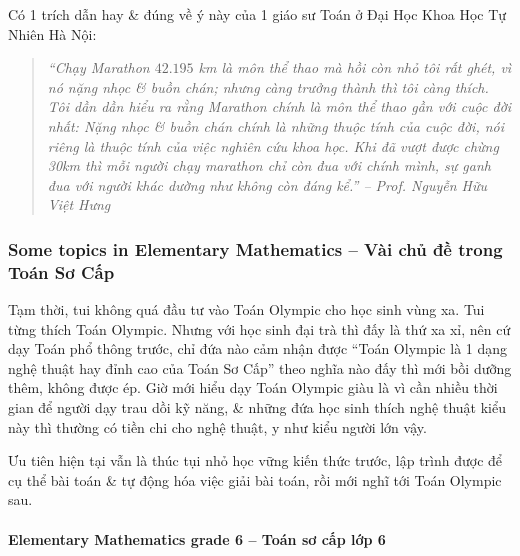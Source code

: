 \documentclass[12pt]{article}
\begin{document}
Có 1 trích dẫn hay \& đúng về ý này của 1 giáo sư Toán ở Đại Học Khoa Học Tự Nhiên Hà Nội:
\begin{quotation}\it
	``Chạy Marathon $42.195$ km là môn thể thao mà hồi còn nhỏ tôi rất ghét, vì nó nặng nhọc \& buồn chán; nhưng càng trưởng thành thì tôi càng thích. Tôi dần dần hiểu ra rằng Marathon chính là môn thể thao gần với cuộc đời nhất: Nặng nhọc \& buồn chán chính là những thuộc tính của cuộc đời, nói riêng là thuộc tính của việc nghiên cứu khoa học. Khi đã vượt được chừng 30km thì mỗi người chạy marathon chỉ còn đua với chính mình, sự ganh đua với người khác dường như không còn đáng kể.'' -- Prof. {\sc Nguyễn Hữu Việt Hưng}
\end{quotation}


\subsubsection{Some topics in Elementary Mathematics -- Vài chủ đề trong Toán Sơ Cấp}
Tạm thời, tui không quá đầu tư vào Toán Olympic cho học sinh vùng xa. Tui từng thích Toán Olympic. Nhưng với học sinh đại trà thì đấy là thứ xa xỉ, nên cứ dạy Toán phổ thông trước, chỉ đứa nào cảm nhận được ``Toán Olympic là 1 dạng nghệ thuật hay đỉnh cao của Toán Sơ Cấp'' theo nghĩa nào đấy thì mới bồi dưỡng thêm, không được ép. Giờ mới hiểu dạy Toán Olympic giàu là vì cần nhiều thời gian để người dạy trau dồi kỹ năng, \& những đứa học sinh thích nghệ thuật kiểu này thì thường có tiền chi cho nghệ thuật, y như kiểu người lớn vậy.

Ưu tiên hiện tại vẫn là thúc tụi nhỏ học vững kiến thức trước, lập trình được để cụ thể bài toán \& tự động hóa việc giải bài toán, rồi mới nghĩ tới Toán Olympic sau.

\paragraph{Elementary Mathematics grade 6 -- Toán sơ cấp lớp 6}
\end{document}
